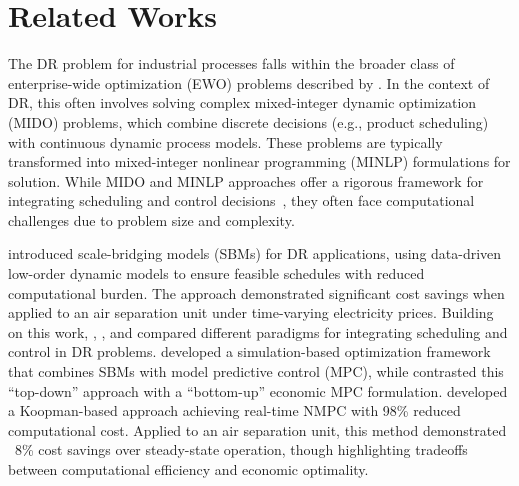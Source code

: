 \section{Related Works}
The DR problem for industrial processes falls within the broader class of enterprise-wide optimization (EWO) problems described by \citet{flores-tlacuahuac_simultaneous_2006}. In the context of DR, this often involves solving complex mixed-integer dynamic optimization (MIDO) problems, which combine discrete decisions (e.g., product scheduling) with continuous dynamic process models. These problems are typically transformed into mixed-integer nonlinear programming (MINLP) formulations for solution. While MIDO and MINLP approaches offer a rigorous framework for integrating scheduling and control decisions~\citep{zhang2015air}, they often face computational challenges due to problem size and complexity.


\citet{pattison_optimal_2016} introduced scale-bridging models (SBMs) for DR applications, using data-driven low-order dynamic models to ensure feasible schedules with reduced computational burden. The approach demonstrated significant cost savings when applied to an air separation unit under time-varying electricity prices. Building on this work, \citet{dias_simulation-based_2018}, \citet{caspari_integration_2020}, and \citet{schulze2023datadrivenmodelreductionnonlinear} compared different paradigms for integrating scheduling and control in DR problems. \citeauthor{dias_simulation-based_2018} developed a simulation-based optimization framework that combines SBMs with model predictive control (MPC), while \citeauthor{caspari_integration_2020} contrasted this ``top-down'' approach with a ``bottom-up'' economic MPC formulation. \citeauthor{schulze2023datadrivenmodelreductionnonlinear} developed a Koopman-based approach achieving real-time NMPC with 98\% reduced computational cost. Applied to an air separation unit, this method demonstrated ~8\% cost savings over steady-state operation, though highlighting tradeoffs between computational efficiency and economic optimality.

